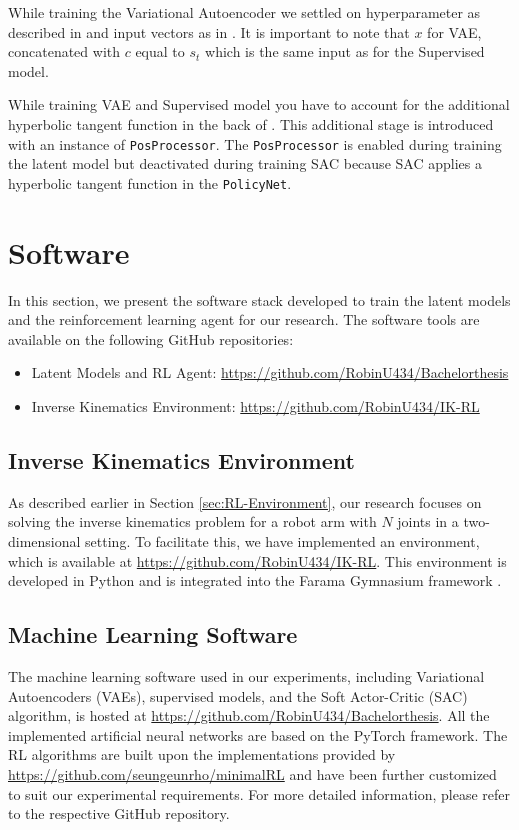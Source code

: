 While training the Variational Autoencoder we settled on hyperparameter as described in  and input vectors as in . It is important to note that $x$ for VAE, concatenated with $c$ equal to $s_t$ which is the same input as for the Supervised model. 

While training VAE and Supervised model you have to account for the additional hyperbolic tangent function in the back of . This additional stage is introduced with an instance of \texttt{PosProcessor}. The \texttt{PosProcessor} is enabled during training the latent model but deactivated during training SAC because SAC applies a hyperbolic tangent function in the \texttt{PolicyNet}. 

\section{Software}

In this section, we present the software stack developed to train the latent models and the reinforcement learning agent for our research. The software tools are available on the following GitHub repositories:

\begin{itemize}
    \item Latent Models and RL Agent: \url{https://github.com/RobinU434/Bachelorthesis}
    \item Inverse Kinematics Environment: \url{https://github.com/RobinU434/IK-RL}
\end{itemize}

\subsection{Inverse Kinematics Environment}

As described earlier in Section \ref{sec:RL-Environment}, our research focuses on solving the inverse kinematics problem for a robot arm with $N$ joints in a two-dimensional setting. To facilitate this, we have implemented an environment, which is available at \url{https://github.com/RobinU434/IK-RL}. This environment is developed in Python and is integrated into the Farama Gymnasium framework \cite{Gymnasium}.

\subsection{Machine Learning Software}

The machine learning software used in our experiments, including Variational Autoencoders (VAEs), supervised models, and the Soft Actor-Critic (SAC) algorithm, is hosted at \url{https://github.com/RobinU434/Bachelorthesis}. All the implemented artificial neural networks are based on the PyTorch framework. The RL algorithms are built upon the implementations provided by \url{https://github.com/seungeunrho/minimalRL} and have been further customized to suit our experimental requirements. For more detailed information, please refer to the respective GitHub repository.
